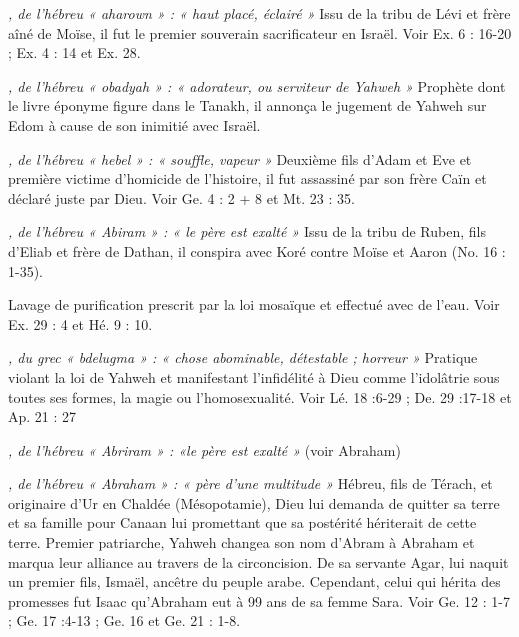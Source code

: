 \begin{multicols}{2}

\textit{, de l'hébreu « aharown » : « haut placé, éclairé »}\newline
Issu de la tribu de Lévi et frère aîné de Moïse, il fut le premier souverain sacrificateur en Israël. Voir Ex. 6 : 16-20 ; Ex. 4 : 14 et Ex. 28.

\textit{, de l'hébreu « obadyah » : « adorateur, ou serviteur de Yahweh »}\newline
Prophète dont le livre éponyme figure dans le Tanakh, il annonça le jugement de Yahweh sur Edom à cause de son inimitié avec Israël.

\textit{, de l'hébreu « hebel » : « souffle, vapeur »}\newline
Deuxième fils d'Adam et Eve et première victime d’homicide de l’histoire, il fut assassiné par son frère Caïn et déclaré juste par Dieu. Voir Ge. 4 : 2 + 8 et Mt. 23 : 35.

\textit{, de l’hébreu « Abiram » : « le père est exalté »}\newline
Issu de la tribu de Ruben, fils d'Eliab et frère de Dathan, il conspira avec Koré contre Moïse et Aaron (No. 16 : 1-35).

\textit{}\newline
Lavage de purification prescrit par la loi mosaïque et effectué avec de l'eau. Voir Ex. 29 : 4 et Hé. 9 : 10.

\textit{, du grec « bdelugma » : « chose abominable, détestable ; horreur »}\newline
Pratique violant la loi de Yahweh et manifestant l’infidélité à Dieu comme l’idolâtrie sous toutes ses formes, la magie ou l’homosexualité. Voir Lé. 18 :6-29 ; De. 29 :17-18 et Ap. 21 : 27

\textit{, de l’hébreu « Abriram » : «le père est exalté »}\newline
(voir Abraham)

\textit{, de l'hébreu « Abraham » : « père d'une multitude »}\newline
Hébreu, fils de Térach, et originaire d'Ur en Chaldée (Mésopotamie), Dieu lui demanda de quitter sa terre et sa famille pour Canaan lui promettant que sa postérité hériterait de cette terre. Premier patriarche, Yahweh changea son nom d’Abram à Abraham et marqua leur alliance au travers de la circoncision. De sa servante Agar, lui naquit un premier fils, Ismaël, ancêtre du peuple arabe. Cependant, celui qui hérita des promesses fut Isaac qu’Abraham eut à 99 ans de sa femme Sara. Voir Ge. 12 : 1-7 ; Ge. 17 :4-13 ; Ge. 16 et Ge. 21 : 1-8.


\end{multicols}
